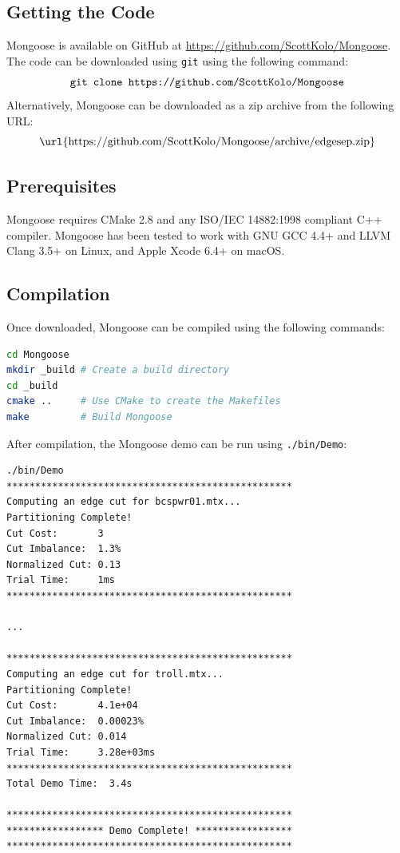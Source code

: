 \documentclass[letter]{article}
\begin{document}
\subsection{Getting the Code}
Mongoose is available on GitHub at \url{https://github.com/ScottKolo/Mongoose}. The code can be downloaded using \texttt{git} using the following command:
\[\text{\texttt{git clone https://github.com/ScottKolo/Mongoose}}\]
Alternatively, Mongoose can be downloaded as a zip archive from the following URL:
\[\text{\url{https://github.com/ScottKolo/Mongoose/archive/edgesep.zip}}\] 

\subsection{Prerequisites}
Mongoose requires CMake 2.8 and any ISO/IEC 14882:1998 compliant C++ compiler. Mongoose has been tested to work with GNU GCC 4.4+ and LLVM Clang 3.5+ on Linux, and Apple Xcode 6.4+ on macOS.

\subsection{Compilation}
Once downloaded, Mongoose can be compiled using the following commands:\\

\begin{lstlisting}[language=bash,numbers=none,xleftmargin=.2\textwidth, xrightmargin=.2\textwidth]
cd Mongoose
mkdir _build # Create a build directory
cd _build 
cmake ..     # Use CMake to create the Makefiles
make         # Build Mongoose
\end{lstlisting}

After compilation, the Mongoose demo can be run using \texttt{./bin/Demo}:\\

\begin{lstlisting}[numbers=none,xleftmargin=.2\textwidth, xrightmargin=.2\textwidth,keywordstyle=\color{black}]
./bin/Demo
**************************************************
Computing an edge cut for bcspwr01.mtx...
Partitioning Complete!
Cut Cost:       3
Cut Imbalance:  1.3%
Normalized Cut: 0.13
Trial Time:     1ms
**************************************************

...

**************************************************
Computing an edge cut for troll.mtx...
Partitioning Complete!
Cut Cost:       4.1e+04
Cut Imbalance:  0.00023%
Normalized Cut: 0.014
Trial Time:     3.28e+03ms
**************************************************
Total Demo Time:  3.4s

**************************************************
***************** Demo Complete! *****************
**************************************************
\end{lstlisting}
\end{document}
